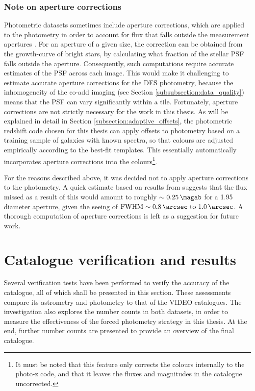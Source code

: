 \subsubsection{Note on aperture corrections}\label{subsubsection:aperture_corrections}
Photometric datasets sometimes include aperture corrections, which are applied to the photometry in order to account for flux that falls outside the measurement apertures \citep{2003AJ....125.1107L,2007AJ....134.1103Q,2011Ap&SS.331....1W}. For an aperture of a given size, the correction can be obtained from the growth-curve of bright stars, by calculating what fraction of the stellar PSF falls outside the aperture. Consequently, such computations require accurate estimates of the PSF across each image. This would make it challenging to estimate accurate aperture corrections for the DES photometry, because the inhomogeneity of the co-add imaging (see Section \ref{subsubsection:data_quality}) means that the PSF can vary significantly within a tile.  Fortunately, aperture corrections are not strictly necessary for the work in this thesis. As will be explained in detail in Section \ref{subsection:adaptive_offsets}, the photometric redshift code  chosen for this thesis can apply offsets to photometry based on a training sample of galaxies with known spectra, so that colours are adjusted empirically according to the best-fit templates. This essentially automatically incorporates aperture corrections into the colours\footnote{It must be noted that this feature only corrects the colours internally to the photo-z code, and that it leaves the fluxes and magnitudes in the \DESVIDEO catalogue uncorrected.}. \par 


For the reasons described above, it was decided not to apply aperture corrections to the \DESVIDEO photometry. A quick estimate based on results from \cite{2003AJ....125.1107L} suggests that the flux missed as a result of this would amount to roughly $\sim\SI{0.25}{\magab}$ for a \SI{1.95}{\arcsec} diameter aperture, given the \DESVIDEO seeing of $\mathrm{FWHM} \sim \SIrange{0.8}{1.0}{\arcsec}$. A thorough computation of \DESVIDEO aperture corrections is left as a suggestion for future work. \par 

    

\section{Catalogue verification and results}\label{section:catalogue_verification}
Several verification tests have been performed to verify the accuracy of the \DESVIDEO catalogue, all of which shall be presented in this section. These assessments compare its astrometry and photometry to that of the \cite{2013MNRAS.428.1281J} VIDEO catalogues. The investigation also explores the number counts in both datasets, in order to measure the effectiveness of the forced photometry strategy in this thesis. At the end, further number counts are presented to provide an overview of the final \DESVIDEO catalogue. \par 


